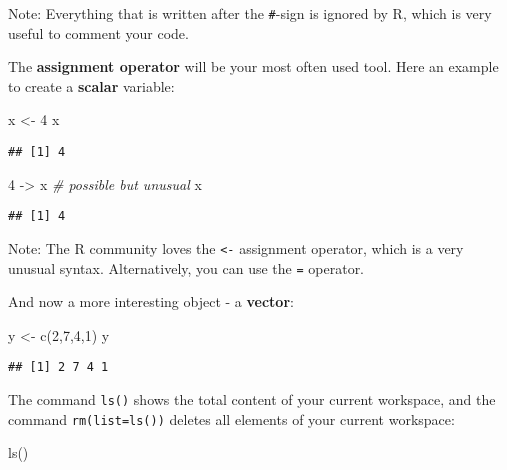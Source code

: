 \documentclass[
]{book}
\newenvironment{Shaded}{\begin{snugshade}}{\end{snugshade}}
\newcommand{\CommentTok}[1]{\textcolor[rgb]{0.56,0.35,0.01}{\textit{#1}}}
\newcommand{\DecValTok}[1]{\textcolor[rgb]{0.00,0.00,0.81}{#1}}
\newcommand{\FunctionTok}[1]{\textcolor[rgb]{0.00,0.00,0.00}{#1}}
\newcommand{\NormalTok}[1]{#1}
\newcommand{\OtherTok}[1]{\textcolor[rgb]{0.56,0.35,0.01}{#1}}
\begin{document}
Note: Everything that is written after the \texttt{\#}-sign is ignored by R, which is very useful to comment your code.

The \textbf{assignment operator} will be your most often used tool. Here an example to create a \textbf{scalar} variable:

\begin{Shaded}
\begin{Highlighting}[]
\NormalTok{x }\OtherTok{\textless{}{-}} \DecValTok{4} 
\NormalTok{x}
\end{Highlighting}
\end{Shaded}

\begin{verbatim}
## [1] 4
\end{verbatim}

\begin{Shaded}
\begin{Highlighting}[]
\DecValTok{4} \OtherTok{{-}\textgreater{}}\NormalTok{ x }\CommentTok{\# possible but unusual}
\NormalTok{x}
\end{Highlighting}
\end{Shaded}

\begin{verbatim}
## [1] 4
\end{verbatim}

Note: The R community loves the \texttt{\textless{}-} assignment operator, which is a very unusual syntax. Alternatively, you can use the \texttt{=} operator.

And now a more interesting object - a \textbf{vector}:

\begin{Shaded}
\begin{Highlighting}[]
\NormalTok{y }\OtherTok{\textless{}{-}} \FunctionTok{c}\NormalTok{(}\DecValTok{2}\NormalTok{,}\DecValTok{7}\NormalTok{,}\DecValTok{4}\NormalTok{,}\DecValTok{1}\NormalTok{)}
\NormalTok{y}
\end{Highlighting}
\end{Shaded}

\begin{verbatim}
## [1] 2 7 4 1
\end{verbatim}

The command \texttt{ls()} shows the total content of your current workspace, and the command \texttt{rm(list=ls())} deletes all elements of your current workspace:

\begin{Shaded}
\begin{Highlighting}[]
\FunctionTok{ls}\NormalTok{()}
\end{Highlighting}
\end{Shaded}
\end{document}
